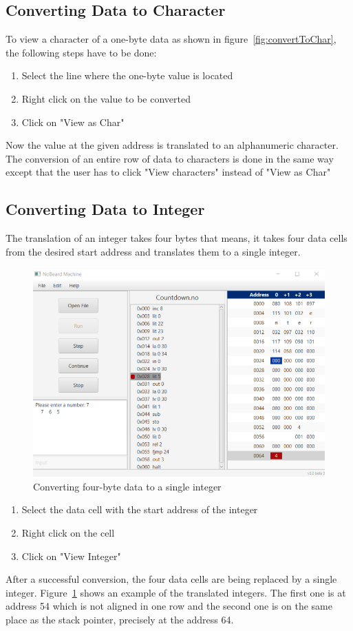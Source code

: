 \subsection{Converting Data to Character}
To view a character of a one-byte data as shown in figure~\ref{fig:convertToChar}, the following steps have to be done:
\begin{enumerate}
\item Select the line where the one-byte value is located 
\item Right click on the value to be converted
\item Click on "View as Char" 
\end{enumerate}
Now the value at the given address is translated to an alphanumeric character. 
The conversion of an entire row of data to characters is done in the same way except that the user has to click "View characters" instead of "View as Char"
\subsection{Converting Data to Integer}
The translation of an integer takes four bytes that means, it takes four data cells from the desired start address and translates them to a single integer.  
\begin{figure}[h] 
	\centering
	\includegraphics[scale=.90]{images/screenshot-4.png}
	\caption{Converting four-byte data to a single integer}
	\label{fig:convertToInt}
\end{figure}
\begin{enumerate}
\item Select the data cell with the start address of the integer
\item Right click on the cell
\item Click on "View Integer"
\end{enumerate}
After a successful conversion, the four data cells are being replaced by a single integer. Figure~\ref{fig:convertToInt} shows an example of the translated integers. The first one is at address 54 which is not aligned in one row and the second one is on the same place as the stack pointer, precisely at the address 64. 

